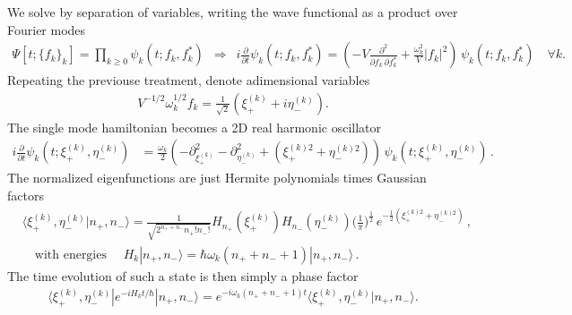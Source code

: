 \documentclass[../QFT_main.tex]{subfiles}
\begin{document}
\begin{mytheorem}
We solve by separation of variables, writing the wave functional as a product over Fourier modes
\begin{align}
    \Psi[t; \{f_k\}_k] = \prod_{k\geq 0} \psi_k(t; f_k, f_k^*)\,\,\,\Rightarrow\,\,\,
    i \frac{\partial}{\partial t} \psi_k(t; f_k, f_k^*) = \left( -V\frac{\partial^2}{\partial f_k \,\partial f_k^*} + \frac{\omega_k^2}{V} |f_k|^2 \right)\,\psi_k(t; f_k, f_k^*)\quad \forall k.
\end{align}
Repeating the previouse treatment, denote adimensional variables 
\begin{align}
    V^{-1/2} \omega_k^{1/2} f_k = \frac{1}{\sqrt{2}}\left(\xi^{(k)}_+ + i \eta^{(k)}_-\right).
\end{align}
The single mode hamiltonian becomes a 2D real harmonic oscillator
\begin{align}
    i \frac{\partial}{\partial t} \psi_k(t; \xi_+^{(k)},\eta_-^{(k)}) &= \frac{\omega_k}{2}\left( -\partial_{\xi_+^{(k)}}^2 - \partial_{\eta_-^{(k)}}^2 + (\xi_+^{(k)2} + \eta_-^{(k)2}) \right)\,\psi_k(t; \xi_+^{(k)},\eta_-^{(k)})\,.
\end{align}
The normalized eigenfunctions are just Hermite polynomials times Gaussian factors 
\begin{align}
    &\langle \xi_+^{(k)},\eta_-^{(k)}| n_+, n_- \rangle = \frac{1}{\sqrt{2^{n_+ + n_-} n_+! n_-!}} H_{n_+}\left( \xi_+^{(k)} \right) H_{n_-}\left( \eta_-^{(k)} \right) \Big(\frac{1}{\pi}\Big)^{\frac{1}{2}}\,e^{-\frac{1}{2} (\xi_+^{(k)2} + \eta_-^{(k)2})}\,,\\[5pt]
    &\quad\text{with energies }\quad H_k |n_+,n_-\rangle = \hbar \omega_k (n_+ + n_- + 1) |n_+, n_-\rangle\,.
\end{align}
The time evolution of such a state is then simply a phase factor
\begin{align}
    \langle \xi_+^{(k)},\eta_-^{(k)}| e^{ -i H_k t/\hbar} |n_+, n_- \rangle = e^{-i \omega_k (n_+ + n_- + 1) t} \langle \xi_+^{(k)},\eta_-^{(k)}| n_+, n_- \rangle.
\end{align}


\end{mytheorem}
\end{document}

